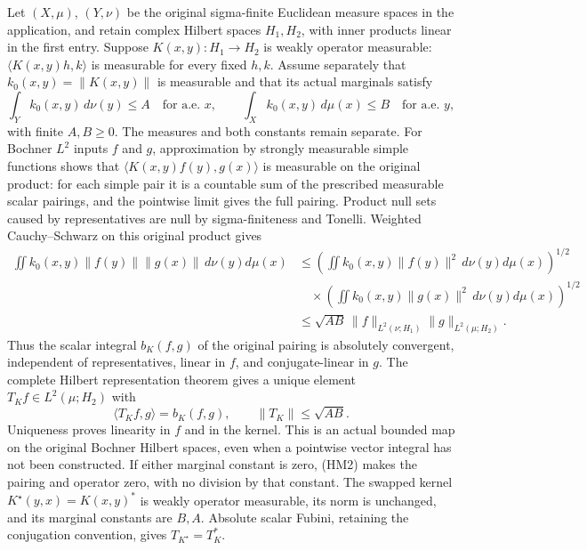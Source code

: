 \documentclass[
  11pt,
]{article}
\begin{document}
Let \((X,\mu)\), \((Y,\nu)\) be the original sigma-finite Euclidean
measure spaces in the application, and retain complex Hilbert spaces
\(H_1,H_2\), with inner products linear in the first entry. Suppose
\(K(x,y):H_1\to H_2\) is weakly operator measurable:
\(\langle K(x,y)h,k\rangle\) is measurable for every fixed \(h,k\).
Assume separately that \(k_0(x,y)=\|K(x,y)\|\) is measurable and that
its actual marginals satisfy \[
\int_Yk_0(x,y)\,d\nu(y)\le A\quad\text{for a.e. }x,
\qquad \int_Xk_0(x,y)\,d\mu(x)\le B\quad\text{for a.e. }y,
\tag{HM1}
\] with finite \(A,B\ge0\). The measures and both constants remain
separate. For Bochner \(L^2\) inputs \(f\) and \(g\), approximation by
strongly measurable simple functions shows that
\(\langle K(x,y)f(y),g(x)\rangle\) is measurable on the original
product: for each simple pair it is a countable sum of the prescribed
measurable scalar pairings, and the pointwise limit gives the full
pairing. Product null sets caused by representatives are null by
sigma-finiteness and Tonelli. Weighted Cauchy--Schwarz on this original
product gives \[
\begin{aligned}
\iint k_0(x,y)\|f(y)\|\|g(x)\|\,d\nu(y)d\mu(x)
&\le\left(\iint k_0(x,y)\|f(y)\|^2\,d\nu(y)d\mu(x)\right)^{1/2}\\
&\quad{}\times\left(\iint k_0(x,y)\|g(x)\|^2\,d\nu(y)d\mu(x)\right)^{1/2}\\
&\le\sqrt{AB}\,\|f\|_{L^2(\nu;H_1)}\|g\|_{L^2(\mu;H_2)}.
\end{aligned}
\tag{HM2}
\] Thus the scalar integral \(b_K(f,g)\) of the original pairing is
absolutely convergent, independent of representatives, linear in \(f\),
and conjugate-linear in \(g\). The complete Hilbert representation
theorem gives a unique element \(T_Kf\in L^2(\mu;H_2)\) with \[
\langle T_Kf,g\rangle=b_K(f,g),\qquad
\|T_K\|\le\sqrt{AB}.
\tag{HM3}
\] Uniqueness proves linearity in \(f\) and in the kernel. This is an
actual bounded map on the original Bochner Hilbert spaces, even when a
pointwise vector integral has not been constructed. If either marginal
constant is zero, (HM2) makes the pairing and operator zero, with no
division by that constant. The swapped kernel \(K^\star(y,x)=K(x,y)^*\)
is weakly operator measurable, its norm is unchanged, and its marginal
constants are \(B,A\). Absolute scalar Fubini, retaining the conjugation
convention, gives \(T_{K^\star}=T_K^*\).
\end{document}
